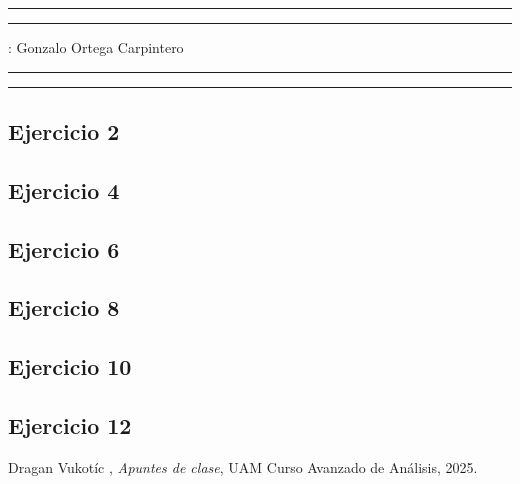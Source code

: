 \documentclass[11pt,a4paper]{article}
\begin{document}
\hrule\hrule
\vspace{1mm}


\vspace{1mm}

 : Gonzalo Ortega Carpintero
\vspace{2mm}

\hrule\hrule

\subsection*{Ejercicio 2}

\subsection*{Ejercicio 4}

\subsection*{Ejercicio 6}

\subsection*{Ejercicio 8}

\subsection*{Ejercicio 10}

\subsection*{Ejercicio 12}

\begin{thebibliography}{9}

  Dragan Vukotíc ,
  \textit{Apuntes de clase},
  UAM Curso Avanzado de Análisis, 2025.
  
\end{thebibliography}
\end{document}
